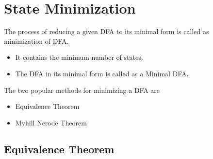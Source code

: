 \section{State Minimization}

The process of reducing a given DFA to its minimal form is called as minimization of DFA.
\begin{itemize}
  \item It contains the minimum number of states.
  \item The DFA in its minimal form is called as a Minimal DFA.
\end{itemize}

The two popular methods for minimizing a DFA are
\begin{itemize}
  \item Equivalence Theorem
  \item Myhill Nerode Theorem
\end{itemize}

\newpage
\subsection{Equivalence Theorem}

